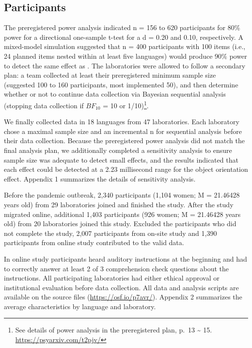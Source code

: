 \documentclass[
  man,floatsintext]{apa6}
\begin{document}
\hypertarget{participants}{%
\subsection{Participants}\label{participants}}

The preregistered power analysis indicated n = 156 to 620 participants for 80\% power for a directional one-sample t-test for a d = 0.20 and 0.10, respectively. A mixed-model simulation suggested that n = 400 participants with 100 items (i.e., 24 planned items nested within at least five languages) would produce 90\% power to detect the same effect as \textcite{zwaanRevisitingMentalSimulation2012}. The laboratories were allowed to follow a secondary plan: a team collected at least their preregistered minimum sample size (suggested 100 to 160 participants, most implemented 50), and then determine whether or not to continue data collection via Bayesian sequential analysis (stopping data collection if \(BF_{10}\) = 10 or 1/10)\footnote{See details of power analysis in the preregistered plan, p.~13 \textasciitilde{} 15. \url{https://psyarxiv.com/t2pjv/}}.

We finally collected data in 18 languages from 47 laboratories. Each laboratory chose a maximal sample size and an incremental n for sequential analysis before their data collection. Because the preregistered power analysis did not match the final analysis plan, we additionally completed a sensitivity analysis to ensure sample size was adequate to detect small effects, and the results indicated that each effect could be detected at a 2.23 millisecond range for the object orientation effect. Appendix 1 summarizes the details of sensitivity analysis.

Before the pandemic outbreak, 2,340 participants (1,104 women; M = 21.46428 years old) from 29 laboratories joined and finished the study. After the study migrated online, additional 1,403 participants (926 women; M = 21.46428 years old) from 20 laboratories joined this study. Excluded the participants who did not complete the study, 2,007 participants from on-site study and 1,390 participants from online study contributed to the valid data.

In online study participants heard auditory instructions at the beginning and had to correctly answer at least 2 of 3 comprehension check questions about the instructions.
All participating laboratories had either ethical approval or institutional evaluation before data collection. All data and analysis scripts are available on the source files (\url{https://osf.io/p7avr/}). Appendix 2 summarizes the average characteristics by language and laboratory.
\end{document}
